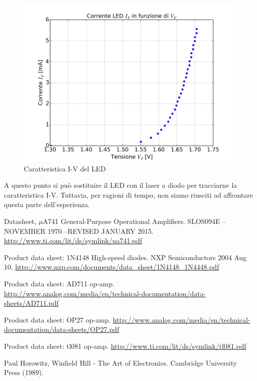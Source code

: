 \documentclass[journal, a4paper]{IEEEtran}
\begin{document}
\begin{figure}
\centering
\includegraphics[width=0.9\linewidth]{./es19}
\caption{Caratteristica I-V del LED}
\label{fig:es19}
\end{figure}

A questo punto si può sostituire il LED con il laser a diodo per tracciarne la caratteristica I-V. Tuttavia, per ragioni di tempo, non siamo riusciti ad affrontare questa parte dell'esperienza.


\begin{thebibliography}{5}

	Datasheet, $\mu $A741 General-Purpose Operational Amplifiers. SLOS094E – NOVEMBER 1970  –REVISED JANUARY 2015.
	\url{http://www.ti.com/lit/ds/symlink/ua741.pdf}

	Product data sheet: 1N4148 High-speed diodes. NXP Semiconductors 2004 Aug 10.
	\url{http://www.nxp.com/documents/data_sheet/1N4148_1N4448.pdf}

	Product data sheet: AD711 op-amp.
	\url{http://www.analog.com/media/en/technical-documentation/data-sheets/AD711.pdf}
	
	Product data sheet: OP27 op-amp.
	\url{http://www.analog.com/media/en/technical-documentation/data-sheets/OP27.pdf}
	
	Product data sheet: tl081 op-amp.
	\url{http://www.ti.com/lit/ds/symlink/tl081.pdf}

	Paul Horowitz, Winfield Hill - The Art of Electronics. Cambridge University Press (1989).
	
\end{thebibliography}
\end{document}
